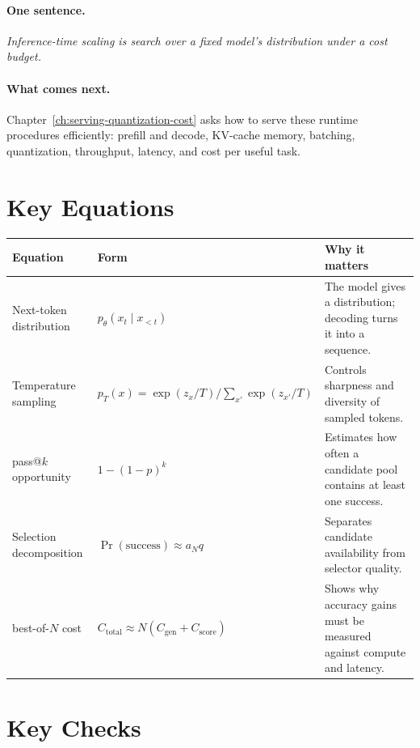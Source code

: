 \paragraph{One sentence.} \emph{Inference-time scaling is search over a fixed model's distribution under a cost budget.}

\paragraph{What comes next.} Chapter~\ref{ch:serving-quantization-cost} asks how to serve these runtime procedures efficiently: prefill and decode, KV-cache memory, batching, quantization, throughput, latency, and cost per useful task.

\section*{Key Equations}

\begin{center}
\small
\begin{tabularx}{\textwidth}{@{}p{3.5cm}p{5.2cm}X@{}}
\toprule
\textbf{Equation} & \textbf{Form} & \textbf{Why it matters} \\
\midrule
Next-token distribution & $p_\theta(x_t \mid x_{<t})$ & The model gives a distribution; decoding turns it into a sequence. \\
Temperature sampling & $p_T(x) = \exp(z_x/T) / \sum_{x'} \exp(z_{x'}/T)$ & Controls sharpness and diversity of sampled tokens. \\
pass@$k$ opportunity & $1-(1-p)^k$ & Estimates how often a candidate pool contains at least one success. \\
Selection decomposition & $\Pr(\text{success}) \approx a_N q$ & Separates candidate availability from selector quality. \\
best-of-$N$ cost & $C_{\text{total}} \approx N(C_{\text{gen}}+C_{\text{score}})$ & Shows why accuracy gains must be measured against compute and latency. \\
\bottomrule
\end{tabularx}
\normalsize
\end{center}

\section*{Key Checks}

